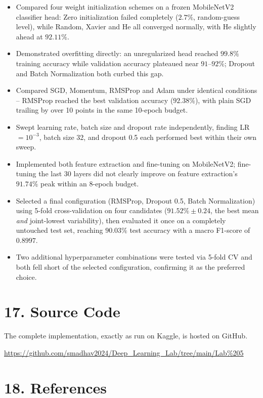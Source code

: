 \documentclass[10pt]{article}
\begin{document}
\begin{itemize}
\item Compared four weight initialization schemes on a frozen MobileNetV2
classifier head: Zero initialization failed completely ($2.7\%$,
random-guess level), while Random, Xavier and He all converged
normally, with He slightly ahead at $92.11\%$.
\item Demonstrated overfitting directly: an unregularized head reached
$99.8\%$ training accuracy while validation accuracy plateaued near
$91$--$92\%$; Dropout and Batch Normalization both curbed this gap.
\item Compared SGD, Momentum, RMSProp and Adam under identical
conditions -- RMSProp reached the best validation accuracy
($92.38\%$), with plain SGD trailing by over 10 points in the same
10-epoch budget.
\item Swept learning rate, batch size and dropout rate independently,
finding LR $=10^{-3}$, batch size 32, and dropout 0.5 each performed
best within their own sweep.
\item Implemented both feature extraction and fine-tuning on
MobileNetV2; fine-tuning the last 30 layers did not clearly improve on
feature extraction's $91.74\%$ peak within an 8-epoch budget.
\item Selected a final configuration (RMSProp, Dropout 0.5, Batch
Normalization) using 5-fold cross-validation on four candidates
($91.52\%\pm0.24$, the best mean \emph{and} joint-lowest variability),
then evaluated it once on a completely untouched test set, reaching
$90.03\%$ test accuracy with a macro F1-score of $0.8997$.
\item Two additional hyperparameter combinations were tested via
5-fold CV and both fell short of the selected configuration, confirming
it as the preferred choice.
\end{itemize}

\section*{17. Source Code}

The complete implementation, exactly as run on Kaggle, is hosted on GitHub.

\url{https://github.com/smadhav2024/Deep_Learning_Lab/tree/main/Lab%205}

\section*{18. References}
\end{document}
